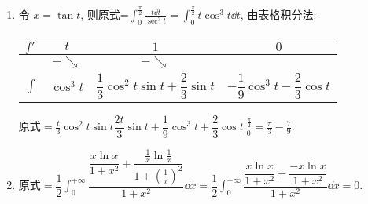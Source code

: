 \begin{solution}
\begin{enumerate}[label=(\arabic{*})]
        \item 令 $x=\tan t$, 则原式=$\displaystyle \int_{0}^{\frac{\pi}{2}}\frac{t\dd t}{\sec^3t}=\int_{0}^{\frac{\pi}{2}}t\cos^3t\dd t$, 由表格积分法:
              \begin{table}[H]
                  \centering
                  \begin{tabular}{l| c c c}
                      $f'$   & $t$         & $1$                                            & $0$                                       \\
                      \midrule
                             & $+\searrow$ & $-\searrow$                                                                                \\
                      \midrule
                      $\int$ & $\cos^3t$   & $\dfrac{1}{3}\cos^2t\sin t+\dfrac{2}{3}\sin t$ & $-\dfrac{1}{9}\cos^3t-\dfrac{2}{3}\cos t$
                  \end{tabular}
              \end{table}
              $\displaystyle\text{原式}=\frac{t}{3}\cos^2t\sin t\dfrac{2t}{3}\sin t+\dfrac{1}{9}\cos^3t+\dfrac{2}{3}\cos t\bigg |_0^{\frac{\pi}{2}}=\frac{\pi}{3}-\frac{7}{9}.$
        \item $\displaystyle\text{原式}=\dfrac{1}{2}\int_{0}^{+\infty}\dfrac{\dfrac{x\ln x}{1+x^2}+\dfrac{\frac{1}{x}\ln\frac{1}{x}}{1+\left(\frac{1}{x}\right)^2}}{1+x^2}\dd x=\dfrac{1}{2}\int_{0}^{+\infty}\dfrac{\dfrac{x\ln x}{1+x^2}+\dfrac{-x\ln x}{1+x^2}}{1+x^2}\dd x=0.$
    \end{enumerate}
\end{solution}

